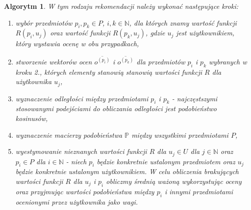 \documentclass[12pt,a4paper]{report}
\newtheorem{algorytm}[df]{Algorytm}
\newcommand{\setN}{\mathbb{N}}
\newcommand{\setUzytkownicy}{\mathit{U}}
\newcommand{\setPrzedmioty}{\mathit{P}}
\begin{document}
\begin{algorytm}
W tym rodzaju rekomendacji należy wykonać następujące kroki:
\begin{enumerate}
\item wybór przedmiotów $p_i, p_k \in \setPrzedmioty$, $i,k \in \setN$, dla których znamy wartość funkcji $R(p_i,u_j)$ oraz wartość funkcji $R(p_k,u_j)$, gdzie $u_j$ jest użytkownikiem, który wystawia ocenę w obu przypadkach,
\item stworzenie wektorów ocen $\overline{o^{(p_i)}}$ i $\overline{o^{(p_k)}}$ dla przedmiotów $p_i$ i $p_k$ wybranych w kroku 2., których elementy stanowią stanowią wartości funkcji $R$ dla użytkownika $u_j$,
\item wyznaczenie odległości między przedmiotami $p_i$ i $p_k$ - najczęstszymi stosowanymi podejściami do obliczania odległości jest podobieństwo kosinusów,
\item wyznaczenie macierzy podobieństwa $\mathbb{P}$ między wszystkimi przedmiotami $\setPrzedmioty$,
\item wyestymowanie nieznanych wartości funkcji $R$ dla $u_j \in \setUzytkownicy$ dla $j \in \setN$ oraz $p_i \in \setPrzedmioty$ dla $i \in \setN$  - niech $p_i$ będzie konkretnie ustalonym przedmiotem oraz $u_j$ będzie konkretnie ustalonym użytkownikiem. W celu obliczenia brakujących wartości funkcji $R$ dla $u_j$ i $p_i$ obliczmy średnią ważoną wykorzystując oceny oraz przyjmując wartości podobieństwa między $p_i$ i innymi przedmiotami ocenionymi przez użytkownika jako wagi.
\end{enumerate}
\end{algorytm}
\end{document}
